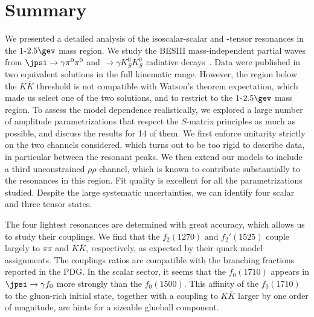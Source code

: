 \section{Summary}
\label{sec:summary}
We presented a detailed analysis of the isoscalar-scalar and -tensor resonances in the $1$-$2.5\gev$ mass region. We study the BESIII mass-independent partial waves from $\jpsi \to \gamma \pi^0\pi^0$ and $\to \gamma K_S^0 K_S^0$ radiative decays~\cite{Ablikim:2015umt,Ablikim:2018izx}. 
Data were published in two equivalent solutions in the full kinematic range. However, the region below the $K\bar K$ threshold is not compatible with Watson's theorem expectation, which made us select one of the two solutions, and to restrict to the $1$-$2.5\gev$ mass region.
To assess the model dependence realistically, we explored a large number of amplitude parametrizations that respect the $S$-matrix principles as much as possible, and discuss the results for 14 of them. We first enforce unitarity strictly on the two channels considered, which turns out to be too rigid to describe data, in particular between the resonant peaks. We then extend our models to include a third unconstrained $\rho\rho$ channel, which is known to contribute substantially to the resonances in this region. Fit quality is excellent for all the parametrizations studied. Despite the large systematic uncertainties, we can identify four scalar and three tensor states. 

The four lightest resonances are determined with great accuracy, which allows us to study their couplings. We find that the $f_2(1270)$ and $f_2'(1525)$ couple largely to $\pi\pi$ and $K\bar K$, respectively, as expected by their quark model assignments. The couplings ratios are compatible with the branching fractions reported in the PDG. In the scalar sector, it seems that the $f_0(1710)$ appears in $\jpsi \to \gamma f_0$ more strongly than the $f_0(1500)$. This affinity of the $f_0(1710)$ to the gluon-rich initial state, together with a coupling to $K\bar K$ larger by one order of magnitude, are hints for a sizeable glueball component.

